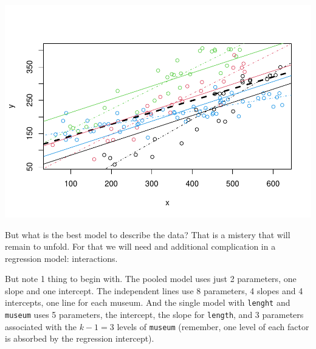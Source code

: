 \documentclass[
]{book}
\newenvironment{Shaded}{\begin{snugshade}}{\end{snugshade}}
\newcommand{\AttributeTok}[1]{\textcolor[rgb]{0.13,0.29,0.53}{#1}}
\newcommand{\DecValTok}[1]{\textcolor[rgb]{0.00,0.00,0.81}{#1}}
\newcommand{\FunctionTok}[1]{\textcolor[rgb]{0.13,0.29,0.53}{\textbf{#1}}}
\newcommand{\NormalTok}[1]{#1}
\newcommand{\SpecialCharTok}[1]{\textcolor[rgb]{0.81,0.36,0.00}{\textbf{#1}}}
\begin{document}
\begin{Shaded}
\end{Shaded}

\includegraphics{ECOMODbook_files/figure-latex/a7.16-1.pdf}

But what is the best model to describe the data? That is a mistery that will remain to unfold. For that we will need and additional complication in a regression model: interactions.

But note 1 thing to begin with. The pooled model uses just 2 parameters, one slope and one intercept. The independent lines use 8 parameters, 4 slopes and 4 intercepts, one line for each museum. And the single model with \texttt{lenght} and \texttt{museum} uses 5 parameters, the intercept, the slope for \texttt{length}, and 3 parameters associated with the \(k-1=3\) levels of \texttt{museum} (remember, one level of each factor is absorbed by the regression intercept).
\end{document}
